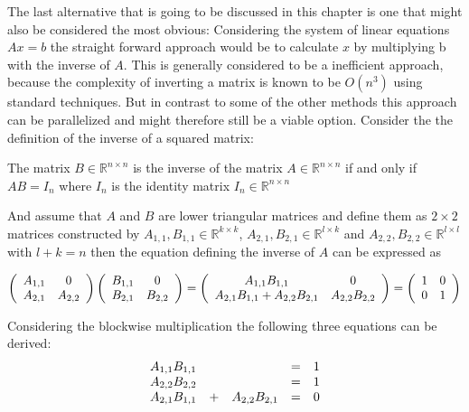 The last alternative that is going to be discussed in this chapter is one that might also be considered the most obvious: Considering the system of linear equations $Ax=b$ the straight forward approach would be to calculate $x$ by multiplying b with the inverse of $A$. This is generally considered to be a inefficient approach, because the complexity of inverting a matrix is known to be $O(n^3)$ using standard techniques. But in contrast to some of the other methods this approach can be parallelized and might therefore still be a viable option. Consider the the definition of the inverse of a squared matrix:
\begin{definition}
    The matrix $B \in \mathbb{R}^{n \times n}$ is the inverse of the matrix $A \in \mathbb{R}^{n \times n}$ if and only if $A B = I_n$ where $I_n$ is the identity matrix $I_n \in \mathbb{R}^{n \times n}$ 
\end{definition}

And assume that $A$ and $B$ are lower triangular matrices and define them as $2 \times 2$ matrices constructed by $A_{1,1}, B_{1,1} \in \mathbb{R}^{k \times k}$, $A_{2,1}, B_{2,1} \in \mathbb{R}^{l \times k}$ and $A_{2,2}, B_{2,2} \in \mathbb{R}^{l \times l}$ with $l+k=n$ then the equation defining the inverse of $A$ can be expressed as

\begin{equation}\label{eq:derive_recursive_inversion_1}
   \left(\begin{array}[c]{cc}
        A_{1,1} & 0\\
        A_{2,1} & A_{2,2}
    \end{array}\right) 
    \left(\begin{array}[c]{cc}
        B_{1,1} & 0\\
        B_{2,1} & B_{2,2}
    \end{array}\right) 
    = 
    \left(\begin{array}[c]{cc}
        A_{1,1} B_{1,1} & 0\\
        A_{2,1} B_{1,1} + A_{2,2} B_{2,1} & A_{2,2} B_{2,2}
    \end{array}\right) 
    = 
    \left(\begin{array}[c]{cc}
        1 & 0\\
        0 & 1
    \end{array}\right)
\end{equation}

Considering the blockwise multiplication the following three equations can be derived:
\begin{equation}\label{eq:derive_recursive_inversion_2}
    \begin{array}[c]{ccccc}
        A_{1,1} B_{1,1} && &=& 1 \\
        A_{2,2} B_{2,2} && &=& 1 \\
        A_{2,1} B_{1,1} &+& A_{2,2} B_{2,1} &=& 0
    \end{array}
\end{equation}

